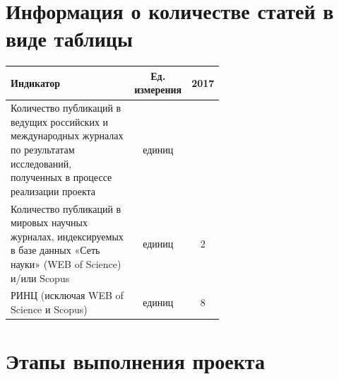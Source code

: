 \documentclass[a4paper,12pt,openany,final]{extreport}
\makeatletter
\newcommand\theyear{2017}
\def\vhrulefill#1{\leavevmode\leaders\hrule\@height#1\hfill \kern\z@}
\newcommand\toprule{\noindent\vhrulefill{2pt}}
\newcommand\T{\rule{0pt}{2.6ex}}       %
\makeatother
\begin{document}
\chapter{Информация о количестве статей в виде таблицы}

\begin{center}
\begin{tabular}[]{|>{\raggedright}m{0.6\linewidth}|c|c|}
\hline
\T\centering Индикатор & Ед. измерения & \theyear\tabularnewline\hline
\T Количество публикаций в ведущих российских и международных журналах по
результатам исследований, полученных в процессе реализации проекта &
единиц &\tabularnewline\hline
\T Количество публикаций в мировых научных журналах, индексируемых в базе
данных «Сеть науки» (WEB of Science) и/или Scopus & единиц &
2\tabularnewline\hline
\T РИНЦ (исключая WEB of Science и Scopus) & единиц & 8\tabularnewline\hline
\end{tabular}
\end{center}

\chapter{Этапы выполнения проекта}

\end{document}
